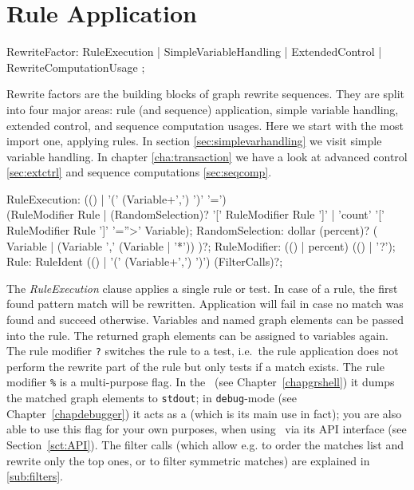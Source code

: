 \section{Rule Application} \label{sec:ruleapplication}

\begin{rail} 
  RewriteFactor: RuleExecution
     | SimpleVariableHandling
     | ExtendedControl
     | RewriteComputationUsage
	; 
\end{rail}

Rewrite factors are the building blocks of graph rewrite sequences.
They are split into four major areas: rule (and sequence) application, simple variable handling, extended control, and sequence computation usages.
Here we start with the most import one, applying rules.
In section \ref{sec:simplevarhandling} we visit simple variable handling.
In chapter \ref{cha:transaction} we have a look at advanced control \ref{sec:extctrl} and sequence computations \ref{sec:seqcomp}.

\begin{rail}
  RuleExecution: (() | '(' (Variable+',') ')' '=') \\ (RuleModifier Rule | (RandomSelection)? '[' RuleModifier Rule ']' | 'count' '[' RuleModifier Rule ']' '=''>' Variable);
  RandomSelection: dollar (percent)? ( Variable | (Variable ',' (Variable | '*')) )?;
  RuleModifier: (() | percent) (() | '?');
  Rule: RuleIdent (() | '(' (Variable+',') ')') (FilterCalls)?;
\end{rail}

The \emph{RuleExecution} clause applies a single rule or test.
In case of a rule, the first found pattern match will be rewritten.
Application will fail in case no match was found and succeed otherwise. 
Variables and named graph elements can be passed into the rule.
The returned graph elements can be assigned to variables again.
The rule modifier \texttt{?} switches the rule to a test, i.e.\ the rule application does not perform the rewrite part of the rule but only tests if a match exists.
The rule modifier \texttt{\%} is a multi-purpose flag. 
In the \GrShell\ (see Chapter~\ref{chapgrshell}) it dumps the matched graph elements to \texttt{stdout};
in \texttt{debug}-mode (see Chapter~\ref{chapdebugger}) it acts as a  (which is its main use in fact);
you are also able to use this flag for your own purposes, when using \GrG\ via its API interface (see Section~\ref{sct:API}).
The filter calls (which allow e.g. to order the matches list and rewrite only the top ones, or to filter symmetric matches) are explained in \ref{sub:filters}.

